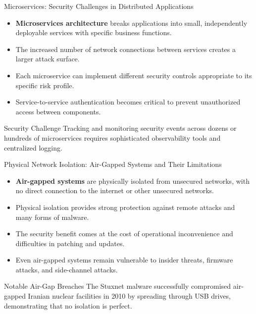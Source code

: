 \documentclass{beamer}
\begin{document}
\begin{frame}{Microservices: Security Challenges in Distributed Applications}
\begin{itemize}
\item \textbf{Microservices architecture} breaks applications into small, independently deployable services with specific business functions.
\item The increased number of network connections between services creates a larger attack surface.
\item Each microservice can implement different security controls appropriate to its specific risk profile.
\item Service-to-service authentication becomes critical to prevent unauthorized access between components.
\end{itemize}

\begin{alertblock}{Security Challenge}
Tracking and monitoring security events across dozens or hundreds of microservices requires sophisticated observability tools and centralized logging.
\end{alertblock}
\end{frame}

\begin{frame}{Physical Network Isolation: Air-Gapped Systems and Their Limitations}
\begin{itemize}
\item \textbf{Air-gapped systems} are physically isolated from unsecured networks, with no direct connection to the internet or other unsecured networks.
\item Physical isolation provides strong protection against remote attacks and many forms of malware.
\item The security benefit comes at the cost of operational inconvenience and difficulties in patching and updates.
\item Even air-gapped systems remain vulnerable to insider threats, firmware attacks, and side-channel attacks.
\end{itemize}

\begin{exampleblock}{Notable Air-Gap Breaches}
The Stuxnet malware successfully compromised air-gapped Iranian nuclear facilities in 2010 by spreading through USB drives, demonstrating that no isolation is perfect.
\end{exampleblock}
\end{frame}
\end{document}
